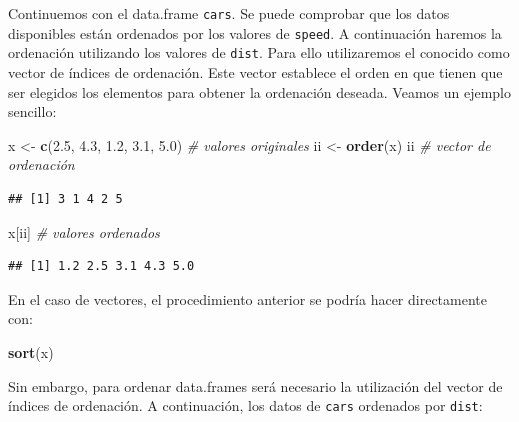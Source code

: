 \documentclass[]{book}
\newenvironment{Shaded}{\begin{snugshade}}{\end{snugshade}}
\newcommand{\CommentTok}[1]{\textcolor[rgb]{0.56,0.35,0.01}{\textit{#1}}}
\newcommand{\FloatTok}[1]{\textcolor[rgb]{0.00,0.00,0.81}{#1}}
\newcommand{\KeywordTok}[1]{\textcolor[rgb]{0.13,0.29,0.53}{\textbf{#1}}}
\newcommand{\NormalTok}[1]{#1}
\newcommand{\OperatorTok}[1]{\textcolor[rgb]{0.81,0.36,0.00}{\textbf{#1}}}
\newcommand{\StringTok}[1]{\textcolor[rgb]{0.31,0.60,0.02}{#1}}
\begin{document}
Continuemos con el data.frame \texttt{cars}.
Se puede comprobar que los datos disponibles están ordenados por
los valores de \texttt{speed}. A continuación haremos la ordenación utilizando
los valores de \texttt{dist}. Para ello utilizaremos el conocido como vector de
índices de ordenación.
Este vector establece el orden en que tienen que ser elegidos los
elementos para obtener la ordenación deseada.
Veamos un ejemplo sencillo:

\begin{Shaded}
\begin{Highlighting}[]
\NormalTok{x <-}\StringTok{ }\KeywordTok{c}\NormalTok{(}\FloatTok{2.5}\NormalTok{, }\FloatTok{4.3}\NormalTok{, }\FloatTok{1.2}\NormalTok{, }\FloatTok{3.1}\NormalTok{, }\FloatTok{5.0}\NormalTok{) }\CommentTok{# valores originales}
\NormalTok{ii <-}\StringTok{ }\KeywordTok{order}\NormalTok{(x)}
\NormalTok{ii    }\CommentTok{# vector de ordenación}
\end{Highlighting}
\end{Shaded}

\begin{verbatim}
## [1] 3 1 4 2 5
\end{verbatim}

\begin{Shaded}
\begin{Highlighting}[]
\NormalTok{x[ii] }\CommentTok{# valores ordenados}
\end{Highlighting}
\end{Shaded}

\begin{verbatim}
## [1] 1.2 2.5 3.1 4.3 5.0
\end{verbatim}

En el caso de vectores, el procedimiento anterior se podría
hacer directamente con:

\begin{Shaded}
\begin{Highlighting}[]
\KeywordTok{sort}\NormalTok{(x)}
\end{Highlighting}
\end{Shaded}

Sin embargo, para ordenar data.frames será necesario la utilización del
vector de índices de ordenación. A continuación, los datos de \texttt{cars}
ordenados por \texttt{dist}:

\begin{Shaded}
\end{Shaded}
\end{document}
